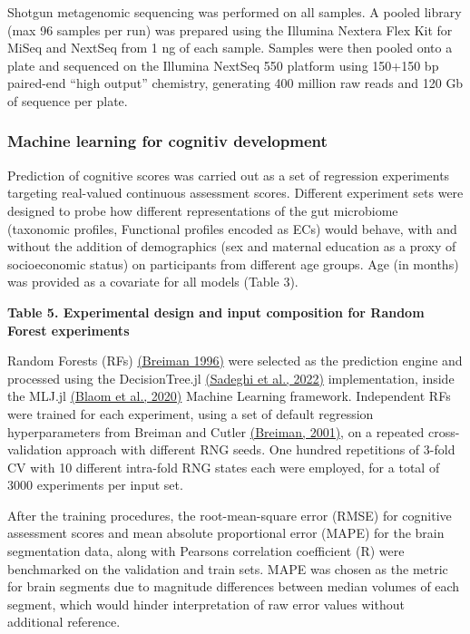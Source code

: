 \documentclass[a4paper]{article}
\begin{document}
Shotgun metagenomic sequencing was performed on all samples. A pooled
library (max 96 samples per run) was prepared using the Illumina Nextera
Flex Kit for MiSeq and NextSeq from 1 ng of each sample. Samples were
then pooled onto a plate and sequenced on the Illumina NextSeq 550
platform using 150+150 bp paired-end ``high output'' chemistry,
generating 400 million raw reads and 120 Gb of sequence per plate.

\subsubsection{Machine learning for cognitiv
development}

Prediction of cognitive scores was carried out as a set of regression
experiments targeting real-valued continuous assessment scores.
Different experiment sets were designed to probe how different
representations of the gut microbiome (taxonomic profiles, Functional
profiles encoded as ECs) would behave, with and without the addition of
demographics (sex and maternal education as a proxy of socioeconomic
status) on participants from different age groups. Age (in months) was
provided as a covariate for all models (Table 3).

\textbf{Table 5. Experimental design and input composition for Random
Forest experiments}



Random Forests (RFs) \href{https://paperpile.com/c/dPbU4e/VDqU}{(Breiman
1996)} were selected as the prediction engine and processed using the
DecisionTree.jl
\href{https://www.zotero.org/google-docs/?dQLyDs}{(Sadeghi et al.,
2022)} implementation, inside the MLJ.jl
\href{https://www.zotero.org/google-docs/?y8ywGI}{(Blaom et al., 2020)}
Machine Learning framework. Independent RFs were trained for each
experiment, using a set of default regression hyperparameters from
Breiman and Cutler
\href{https://www.zotero.org/google-docs/?d3gqFh}{(Breiman, 2001)}, on a
repeated cross-validation approach with different RNG seeds. One hundred
repetitions of 3-fold CV with 10 different intra-fold RNG states each
were employed, for a total of 3000 experiments per input set.

After the training procedures, the root-mean-square error (RMSE) for
cognitive assessment scores and mean absolute proportional error (MAPE)
for the brain segmentation data, along with Pearson\textquotesingle s
correlation coefficient (R) were benchmarked on the validation and train
sets. MAPE was chosen as the metric for brain segments due to magnitude
differences between median volumes of each segment, which would hinder
interpretation of raw error values without additional reference.
\end{document}
